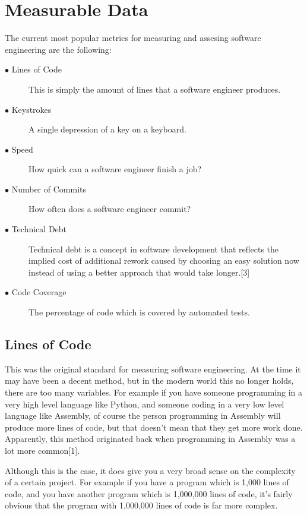 \documentclass[12pt]{report}
\begin{document}
\section{Measurable Data}
The current most popular metrics for measuring and assesing software engineering are the following:
\begin{description}

\item [$\bullet$ Lines of Code] This is simply the amount of lines that a software engineer produces.

\item [$\bullet$ Keystrokes] A single depression of a key on a keyboard.

\item [$\bullet$ Speed] How quick can a software engineer finish a job?

\item [$\bullet$ Number of Commits] How often does a software engineer commit?

\item [$\bullet$ Technical Debt] Technical debt is a concept in software development that reflects the implied cost of additional rework caused by choosing an easy solution now instead of using a better approach that would take longer.[3]

\item [$\bullet$ Code Coverage] The percentage of code which is covered by automated tests. 

\end{description}

\subsection{Lines of Code}
This was the original standard for measuring software engineering. At the time it may have been a decent method, but in the modern world this no longer holds, there are too many variables. For example if you have someone programming in a very high level language like Python, and someone coding in a very low level language like Assembly, of course the person programming in Assembly will produce more lines of code, but that doesn't mean that they get more work done. Apparently, this method originated back when programming in Assembly was a lot more common[1]. \par
Although this is the case, it does give you a very broad sense on the complexity of a certain project. For example if you have a program which is 1,000 lines of code, and you have another program which is 1,000,000 lines of code, it's fairly obvious that the program with 1,000,000 lines of code is far more complex.
\end{document}

